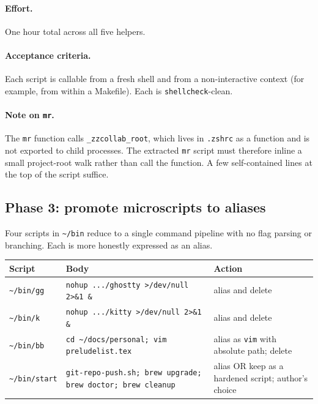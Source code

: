 \documentclass[11pt,letterpaper]{scrartcl}
\begin{document}
\paragraph{Effort.} One hour total across all five helpers.

\paragraph{Acceptance criteria.} Each script is callable from a
fresh shell and from a non-interactive context (for example, from
within a Makefile). Each is \texttt{shellcheck}-clean.

\paragraph{Note on \texttt{mr}.} The \texttt{mr} function calls
\texttt{\_zzcollab\_root}, which lives in \texttt{.zshrc} as a
function and is not exported to child processes. The extracted
\texttt{mr} script must therefore inline a small project-root
walk rather than call the function. A few self-contained lines
at the top of the script suffice.

\subsection{Phase 3: promote microscripts to aliases}

Four scripts in \texttt{\textasciitilde/bin} reduce to a single
command pipeline with no flag parsing or branching. Each is more
honestly expressed as an alias.

\begin{longtable}{@{}lp{2.7in}l@{}}
  \toprule
  \textbf{Script} & \textbf{Body} & \textbf{Action} \\
  \midrule
  \texttt{\textasciitilde/bin/gg}    & \texttt{nohup .../ghostty >/dev/null 2>\&1 \&}             & alias and delete \\
  \texttt{\textasciitilde/bin/k}     & \texttt{nohup .../kitty >/dev/null 2>\&1 \&}              & alias and delete \\
  \texttt{\textasciitilde/bin/bb}    & \texttt{cd \textasciitilde/docs/personal; vim preludelist.tex} & alias as \texttt{vim} with absolute path; delete \\
  \texttt{\textasciitilde/bin/start} & \texttt{git-repo-push.sh; brew upgrade; brew doctor; brew cleanup} & alias OR keep as a hardened script; author's choice \\
  \bottomrule
\end{longtable}
\end{document}
